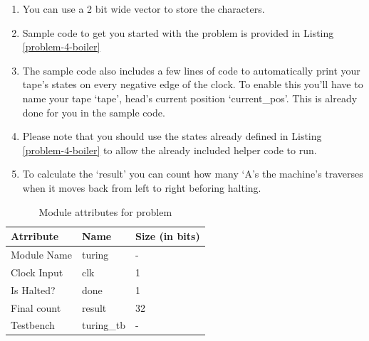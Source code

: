 \documentclass[a4paper,10pt]{article}
\theoremstyle{mytheor}
\newcommand{
  \insertverilog}[3]{
  
}
\newcounter{problemNumber}
\newcounter{hintCount} %
\newcommand{\hintcounter}[1]{%
  \refstepcounter{hintCount}%
  \thehintCount%
  \label{#1}}%
\newcounter{hintcnt}
\newcommand{\hint}[2] {
  \begin{tcolorbox}[arc=1pt,colback=blue!5!white,colframe=blue!75!black,title=\textbf{Hint - \hintcounter{#1}}]  
    #2
  \end{tcolorbox}
  \addtocounter{hintcnt}{1}
}
\begin{document}
{  \hint{hint:problem-3}{ 
    \begin{enumerate}
    \item You can use a 2 bit wide vector to store the characters.
    \item Sample code to get you started with the problem is provided
      in Listing \ref{problem-4-boiler}
    \item The sample code also includes a few lines of code to
      automatically print your tape's states on every negative edge of
      the clock. To enable this you'll have to name your tape `tape',
      head's current position `current\_pos'. This is already done for 
      you in the sample code.
    \item Please note that you should use the states already defined
      in Listing \ref{problem-4-boiler} to allow the already included
      helper code to run.
    \item To calculate the `result' you can count how many `A's the 
      machine's traverses when it moves back from left to right
      beforing halting.
    \end{enumerate}
  }

  \begin{table}[!h]
    \centering
    \caption{Module attributes for problem \theproblemNumber}
    \label{table:problem-3-attr}
    \renewcommand{\arraystretch}{1.1} 
    \begin{tabularx}{0.8\textwidth}{|X|X|X|}
      \hline
      \rowcolor{greatblue}
      \color{white} Atrribute & \color{white}Name & \color{white}Size (in bits) \\
      \hline
      Module Name  & turing          &  -  \\
      Clock Input  & clk             &  1  \\
      Is Halted?   & done            &  1  \\
      Final count  & result          & 32  \\
      Testbench    & turing\_tb      &  -  \\
      \hline
    \end{tabularx}
  \end{table}
  
  \insertverilog{./verilog_files/problem4Boiler.v}{problem-4-boiler}{Code
    to get you started with problem 4.}
}
\end{document}
